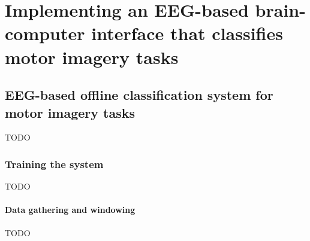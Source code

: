 

\part{Implementing an EEG-based brain-computer interface that classifies motor imagery tasks}



\chapter{EEG-based offline classification system for motor imagery tasks}
\label{ch:offline_bci_system}
TODO

\section{Training the system}
\label{sec:bci_pipeline_training}
TODO


\subsection{Data gathering and windowing}
\label{subsec:bci_pipeline_training_data_gathering_windowing}



TODO


